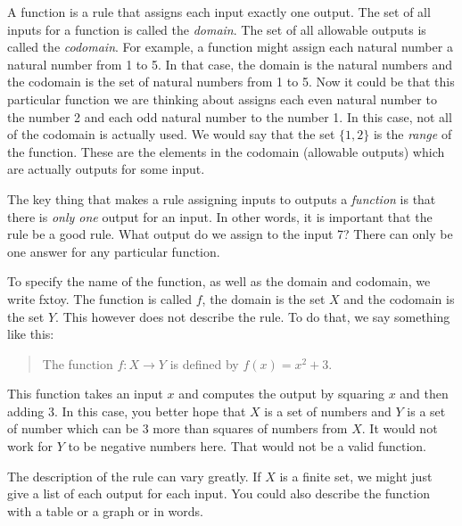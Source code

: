\documentclass[12pt]{article}
\begin{document}
A function is a rule that assigns each input exactly one output.  The set of all inputs for a function is called the \emph{domain}.  The set of all allowable outputs is called the \emph{codomain}.  For example, a function might assign each natural number a natural number from 1 to 5.  In that case, the domain is the natural numbers and the codomain is the set of natural numbers from 1 to 5. Now it could be that this particular function we are thinking about assigns each even natural number to the number 2 and each odd natural number to the number 1.  In this case, not all of the codomain is actually used.  We would say that the set $\{1,2\}$ is the \emph{range} of the function. These are the elements in the codomain (allowable outputs) which are actually outputs for some input. 

The key thing that makes a rule assigning inputs to outputs a \emph{function} is that there is \emph{only one} output for an input.  In other words, it is important that the rule be a good rule.  What output do we assign to the input 7?  There can only be one answer for any particular function. 

To specify the name of the function, as well as the domain and codomain, we write \gls{fxtoy}.  The function is called $f$, the domain is the set $X$ and the codomain is the set $Y$.  This however does not describe the rule.  To do that, we say something like this:

\begin{quote}
  The function $f:X \to Y$ is defined by $f(x) = x^2 + 3$.
\end{quote}

This function takes an input $x$ and computes the output by squaring $x$ and then adding 3.  In this case, you better hope that $X$ is a set of numbers and $Y$ is a set of number which can be 3 more than squares of numbers from $X$.  It would not work for $Y$ to be negative numbers here. That would not be a valid function.

The description of the rule can vary greatly.  If $X$ is a finite set, we might just give a list of each output for each input.  You could also describe the function with a table or a graph or in words.
\end{document}
